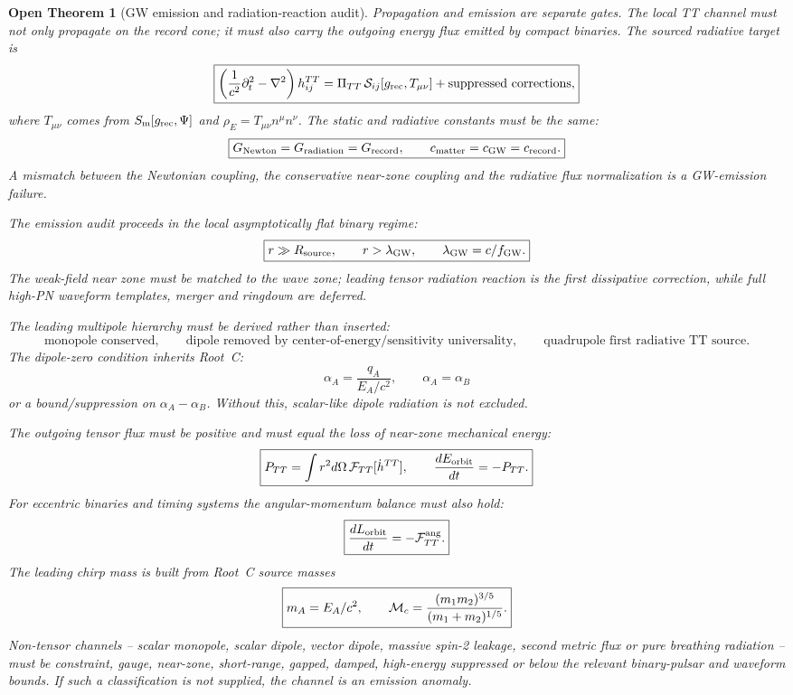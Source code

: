 \documentclass[11pt]{article}
\newtheorem{openthm}{Open Theorem}
\begin{document}
\begin{openthm}[GW emission and radiation-reaction audit]
Propagation and emission are separate gates.  The local TT channel must not
only propagate on the record cone; it must also carry the outgoing energy flux
emitted by compact binaries.  The sourced radiative target is
\[
\boxed{
\left(\frac{1}{c^2}\partial_t^2-\nabla^2\right)h_{ij}^{TT}
=
\Pi_{TT}\,{\cal S}_{ij}[g_{\rm rec},T_{\mu\nu}]
+\hbox{suppressed corrections},
}
\]
where \(T_{\mu\nu}\) comes from \(S_{\rm m}[g_{\rm rec},\Psi]\) and
\(\rho_E=T_{\mu\nu}n^\mu n^\nu\).  The static and radiative constants must be
the same:
\[
\boxed{
G_{\rm Newton}=G_{\rm radiation}=G_{\rm record},
\qquad
c_{\rm matter}=c_{\rm GW}=c_{\rm record}.
}
\]
A mismatch between the Newtonian coupling, the conservative near-zone coupling
and the radiative flux normalization is a GW-emission failure.

The emission audit proceeds in the local asymptotically flat binary regime:
\[
\boxed{
r\gg R_{\rm source},\qquad r>\lambda_{\rm GW},\qquad
\lambda_{\rm GW}=c/f_{\rm GW}.
}
\]
The weak-field near zone must be matched to the wave zone; leading tensor
radiation reaction is the first dissipative correction, while full high-PN
waveform templates, merger and ringdown are deferred.

The leading multipole hierarchy must be derived rather than inserted:
\[
\boxed{
\text{monopole conserved},\qquad
\text{dipole removed by center-of-energy/sensitivity universality},\qquad
\text{quadrupole first radiative TT source}.
}
\]
The dipole-zero condition inherits Root~C:
\[
\boxed{
\alpha_A=\frac{q_A}{E_A/c^2},
\qquad
\alpha_A=\alpha_B
}
\]
or a bound/suppression on \(\alpha_A-\alpha_B\).  Without this, scalar-like
dipole radiation is not excluded.

The outgoing tensor flux must be positive and must equal the loss of near-zone
mechanical energy:
\[
\boxed{
P_{TT}=\int r^2d\Omega\,{\cal F}_{TT}[\dot h^{TT}],
\qquad
\frac{dE_{\rm orbit}}{dt}=-P_{TT}.
}
\]
For eccentric binaries and timing systems the angular-momentum balance must
also hold:
\[
\boxed{
\frac{dL_{\rm orbit}}{dt}=-{\cal F}^{\rm ang}_{TT}.
}
\]
The leading chirp mass is built from Root~C source masses
\[
\boxed{
m_A=E_A/c^2,\qquad
{\cal M}_c=\frac{(m_1m_2)^{3/5}}{(m_1+m_2)^{1/5}}.
}
\]
Non-tensor channels -- scalar monopole, scalar dipole, vector dipole, massive
spin-2 leakage, second metric flux or pure breathing radiation -- must be
constraint, gauge, near-zone, short-range, gapped, damped, high-energy
suppressed or below the relevant binary-pulsar and waveform bounds.  If such a
classification is not supplied, the channel is an emission anomaly.
\end{openthm}
\end{document}
